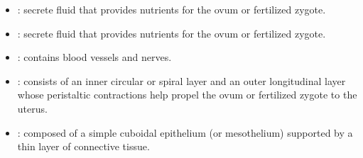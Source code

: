 \begin{multicols}{2}
\begin{itemize}
  \begin{center}
  \end{center}

  \item {}: secrete fluid that provides nutrients for the ovum or fertilized zygote.
  
  \begin{center}
  \end{center}
   
  \item {}: secrete fluid that provides nutrients for the ovum or fertilized zygote.
  
  \begin{center}
  \end{center}
  
  \item {}: contains blood vessels and nerves.
  
  \begin{center}
  \end{center}
  
  \item {}: consists of an inner circular or spiral layer and an outer longitudinal layer whose peristaltic contractions help propel the ovum or fertilized zygote to the uterus.
  
  \begin{center}
  \end{center}
  
  \item {}: composed of a simple cuboidal epithelium (or mesothelium) supported by a thin layer of connective tissue.
  
  \begin{center}
  \end{center}
  
\end{itemize}
\end{multicols}

\newpage
